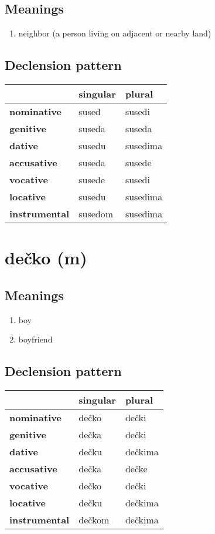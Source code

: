 \subsection*{Meanings}
\begin{enumerate}
\item neighbor (a person living on adjacent or nearby land)
\end{enumerate}
\subsection*{Declension pattern}
\begin{tabularx}{\linewidth}{Xll}
\toprule
{} & singular &    plural \\
\midrule
\textbf{nominative  } &    sused &    susedi \\
\textbf{genitive    } &   suseda &    suseda \\
\textbf{dative      } &   susedu &  susedima \\
\textbf{accusative  } &   suseda &    susede \\
\textbf{vocative    } &   susede &    susedi \\
\textbf{locative    } &   susedu &  susedima \\
\textbf{instrumental} &  susedom &  susedima \\
\bottomrule
\end{tabularx}

\filbreak
\section{dečko (m)}
\subsection*{Meanings}
\begin{enumerate}
\item boy
\item boyfriend
\end{enumerate}
\subsection*{Declension pattern}
\begin{tabularx}{\linewidth}{Xll}
\toprule
{} & singular &   plural \\
\midrule
\textbf{nominative  } &    dečko &    dečki \\
\textbf{genitive    } &    dečka &    dečki \\
\textbf{dative      } &    dečku &  dečkima \\
\textbf{accusative  } &    dečka &    dečke \\
\textbf{vocative    } &    dečko &    dečki \\
\textbf{locative    } &    dečku &  dečkima \\
\textbf{instrumental} &   dečkom &  dečkima \\
\bottomrule
\end{tabularx}

